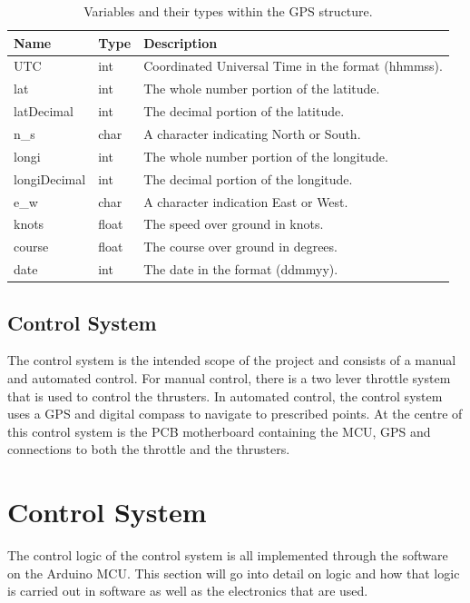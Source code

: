 	\begin{table}[!hb]
		\begin{center}
			\caption{Variables and their types within the GPS structure.}
			\label{tab:3:GPSstruct}
			\begin{tabular}{|l|l|l|}
				\hline
				\textbf{Name} & \textbf{Type} & \textbf{Description} \\
				\hline
				UTC & int & Coordinated Universal Time in the format (hhmmss). \\
				\hline
				lat & int & The whole number portion of the latitude. \\
				\hline
				latDecimal & int & The decimal portion of the latitude. \\
				\hline
				n\_s & char & A character indicating North or South. \\
				\hline
				longi & int & The whole number portion of the longitude. \\
				\hline 
				longiDecimal & int & The decimal portion of the longitude. \\
				\hline 
				e\_w & char & A character indication East or West. \\
				\hline
				knots & float & The speed over ground in knots. \\
				\hline
				course & float & The course over ground in degrees. \\
				\hline
				date & int & The date in the format (ddmmyy). \\
				\hline
			\end{tabular}
		\end{center}
	\end{table}

	\subsection{Control System}
	The control system is the intended scope of the project and consists of a manual and automated control. For manual control, there is a two lever throttle system that is used to control the thrusters. In automated control, the control system uses a GPS and digital compass to navigate to prescribed points. At the centre of this control system is the PCB motherboard containing the MCU, GPS and connections to both the throttle and the thrusters. 
\section{Control System}
The control logic of the control system is all implemented through the software on the Arduino MCU. This section will go into detail on logic and how that logic is carried out in software as well as the electronics that are used. 

